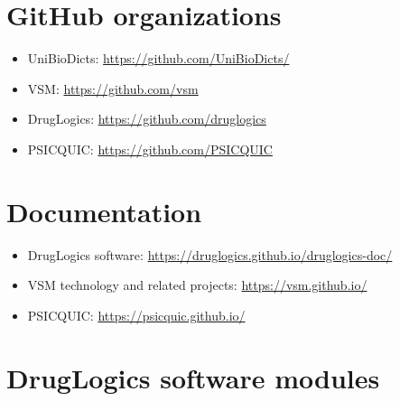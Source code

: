 \documentclass[
  12pt,
]{book}
\providecommand{\tightlist}{%
  \setlength{\itemsep}{0pt}\setlength{\parskip}{0pt}}
\begin{document}
\vspace{-10pt}

\hypertarget{github-org-links}{%
\section*{GitHub organizations}\label{github-org-links}}

\begin{itemize}
\tightlist
\item
  UniBioDicts: \url{https://github.com/UniBioDicts/}
\item
  VSM: \url{https://github.com/vsm}
\item
  DrugLogics: \url{https://github.com/druglogics}
\item
  PSICQUIC: \url{https://github.com/PSICQUIC}
\end{itemize}

\hypertarget{doc-links}{%
\section*{Documentation}\label{doc-links}}

\begin{itemize}
\tightlist
\item
  DrugLogics software: \url{https://druglogics.github.io/druglogics-doc/}
\item
  VSM technology and related projects: \url{https://vsm.github.io/}
\item
  PSICQUIC: \url{https://psicquic.github.io/}
\end{itemize}

\hypertarget{druglogics-soft-links}{%
\section*{DrugLogics software modules}\label{druglogics-soft-links}}
\end{document}
